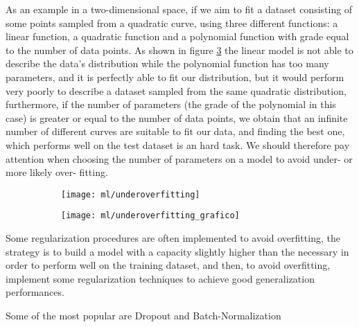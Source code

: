\documentclass[a4paper,11pt]{article}
\begin{document}
As an example in a two-dimensional space, if we aim to fit a dataset consisting of some points sampled from a quadratic curve, using three different functions: a linear function, a quadratic function and a polynomial function with grade equal to the number of data points.
As shown in figure \ref{fig:underoverfitting} the linear model is not able to describe the data's distribution while the polynomial function has too many parameters, and it is perfectly able to fit our distribution, but it would perform very poorly to describe a dataset sampled from the same quadratic distribution, furthermore, if the number of parameters (the grade of the polynomial in this case) is greater or equal to the number of data points, we obtain that an infinite number of different curves are suitable to fit our data, and finding the best one, which performs well on the test dataset is an hard task.
We should therefore pay attention when choosing the number of parameters on a model to avoid under- or more likely over- fitting.


\begin{figure}
\begin{subfigure}{0.4\textwidth}
\texttt{[image: ml/underoverfitting]}
\caption{}
\label{}
\end{subfigure}
\begin{subfigure}{0.4\textwidth}
\texttt{[image: ml/underoverfitting\_grafico]}
\caption{}
\label{}
\end{subfigure}
\caption{}
\label{fig:underoverfitting}
\end{figure}

Some regularization procedures are often implemented to avoid overfitting, the strategy is to build a model with a capacity slightly higher than the necessary in order to perform well on the training dataset, and then, to avoid overfitting, implement some regularization techniques to achieve good generalization performances.

Some of the most popular are Dropout and Batch-Normalization
\end{document}

